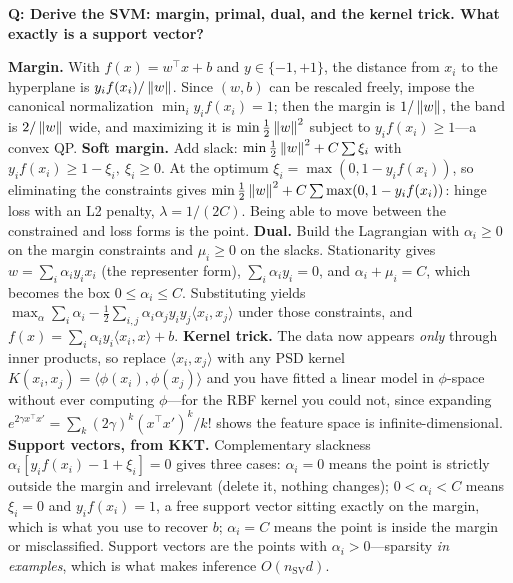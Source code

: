 \begin{interviewq}
\textbf{Q: Derive the SVM: margin, primal, dual, and the kernel trick. What exactly is a support vector?}

 \quad {} \quad \badgefreq{\freqmed}

\stronganswer

\textbf{Margin.} With $f(x)=w^{\top}x+b$ and $y\in\{-1,+1\}$, the distance from $x_i$ to the hyperplane is $y_i f(x_i)/\left\lVert w\right\rVert$. Since $(w,b)$ can be rescaled freely, impose the canonical normalization $\min_i y_i f(x_i)=1$; then the margin is $1/\left\lVert w\right\rVert$, the band is $2/\left\lVert w\right\rVert$ wide, and maximizing it is $\min \tfrac12\left\lVert w\right\rVert^2$ subject to $y_i f(x_i)\ge 1$---a convex QP. \textbf{Soft margin.} Add slack: $\min\tfrac12\left\lVert w\right\rVert^2 + C\sum\xi_i$ with $y_i f(x_i)\ge 1-\xi_i,\ \xi_i\ge 0$. At the optimum $\xi_i=\max(0,1-y_if(x_i))$, so eliminating the constraints gives $\min\tfrac12\left\lVert w\right\rVert^2 + C\sum\max(0,1-y_if(x_i))$: hinge loss with an L2 penalty, $\lambda=1/(2C)$. Being able to move between the constrained and loss forms is the point. \textbf{Dual.} Build the Lagrangian with $\alpha_i\ge0$ on the margin constraints and $\mu_i\ge0$ on the slacks. Stationarity gives $w=\sum_i\alpha_iy_ix_i$ (the representer form), $\sum_i\alpha_iy_i=0$, and $\alpha_i+\mu_i=C$, which becomes the box $0\le\alpha_i\le C$. Substituting yields $\max_\alpha \sum_i\alpha_i - \tfrac12\sum_{i,j}\alpha_i\alpha_jy_iy_j\langle x_i,x_j\rangle$ under those constraints, and $f(x)=\sum_i\alpha_iy_i\langle x_i,x\rangle+b$. \textbf{Kernel trick.} The data now appears \emph{only} through inner products, so replace $\langle x_i,x_j\rangle$ with any PSD kernel $K(x_i,x_j)=\langle\phi(x_i),\phi(x_j)\rangle$ and you have fitted a linear model in $\phi$-space without ever computing $\phi$---for the RBF kernel you could not, since expanding $e^{2\gamma x^{\top}x'}=\sum_k (2\gamma)^k(x^{\top}x')^k/k!$ shows the feature space is infinite-dimensional. \textbf{Support vectors, from KKT.} Complementary slackness $\alpha_i[y_if(x_i)-1+\xi_i]=0$ gives three cases: $\alpha_i=0$ means the point is strictly outside the margin and irrelevant (delete it, nothing changes); $0<\alpha_i<C$ means $\xi_i=0$ and $y_if(x_i)=1$, a free support vector sitting exactly on the margin, which is what you use to recover $b$; $\alpha_i=C$ means the point is inside the margin or misclassified. Support vectors are the points with $\alpha_i>0$---sparsity \emph{in examples}, which is what makes inference $O(n_{\text{SV}}d)$.


\end{interviewq}
